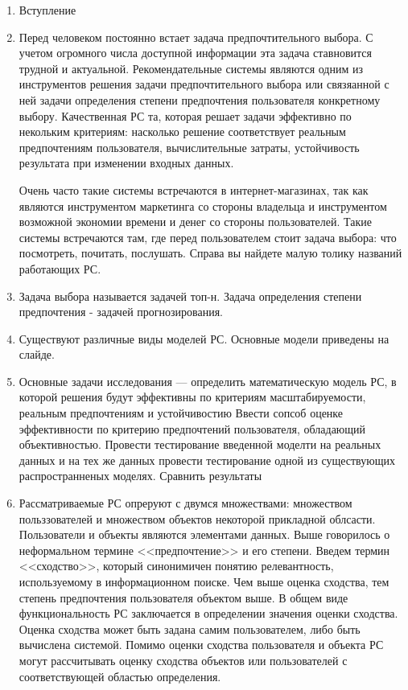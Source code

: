\documentclass[a4paper,14pt]{proc}
\begin{document}
\scriptsize{
\begin{enumerate}

%
%

\item Вступление
\item Перед человеком постоянно встает задача предпочтительного выбора.
С учетом огромного числа доступной информации эта задача ставновится трудной и актуальной.
Рекомендательные системы являются одним из инструментов решения задачи предпочтительного 
выбора или связяанной с ней задачи определения степени предпочтения пользователя конкретному выбору.
Качественная РС та, которая решает задачи эффективно по некольким критериям: насколько решение
соответствует реальным предпочтениям пользователя, вычислительные затраты, устойчивость результата
при изменении входных данных. 

Очень часто такие системы встречаются в интернет-магазинах, так как являются
инструментом маркетинга со стороны владельца и инструментом возможной экономии времени и денег 
со стороны пользователей. Такие системы встречаются там, где перед пользователем стоит задача выбора: 
что посмотреть, почитать, послушать. Справа вы найдете малую толику названий работающих РС.

\item Задача выбора называется задачей топ-н. Задача определения степени предпочтения - задачей прогнозирования.

\item Существуют различные виды моделей РС. Основные модели приведены на слайде. 
\item Основные задачи исследования --- определить математическую модель РС, 
в которой решения будут эффективны по критериям масштабируемости, реальным предпочтениям и устойчивостию
Ввести сопсоб оценке эффективности по критерию предпочтений пользователя, обладающий объективностью.
Провести тестирование введенной моделти на реальных данных и на тех
же данных провести тестирование одной из существующих распространненых моделях. Сравнить результаты
\item Рассматриваемые РС опреруют с двумся множествами: множеством польззователей и множеством объектов
некоторой прикладной облсасти. Пользователи и объекты являются элементами данных.
Выше говорилось о неформальном термине <<предпочтение>> и его степени. Введем термин <<сходство>>,
который синонимичен понятию релевантность, используемому в информационном поиске. Чем выше оценка сходства, 
тем степень предпочтения пользователя объектом выше. В общем виде функциональность РС заключается в определении 
значения оценки сходства. Оценка сходства может быть задана самим пользователем, 
либо быть вычислена системой. Помимо оценки сходства пользователя и объекта РС могут рассчитывать оценку сходства объектов или
пользователей с соответствующей областью определения.


\end{enumerate}}
\end{document}
